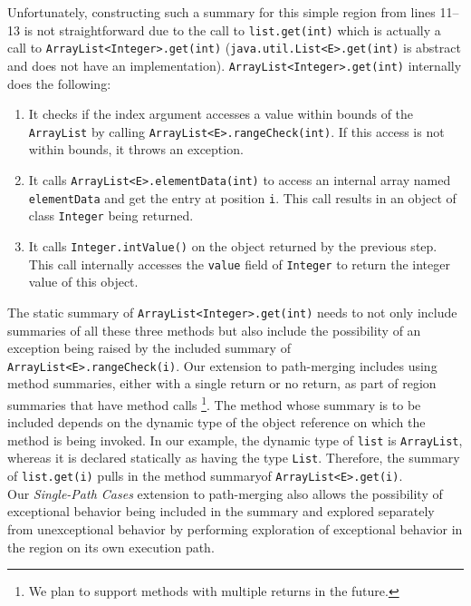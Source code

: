 %
Unfortunately, constructing such a summary for this simple region from lines 11--13 is not straightforward due to the
call to {\tt list.get(int)} which is actually a call to {\tt ArrayList<Integer>.get(int)} ({\tt java.util.List<E>.get(int)} is abstract and does not have an implementation).
%
{\tt ArrayList<Integer>.get(int)} internally does the following:
%
\begin{enumerate}
\item It checks if the index argument accesses a value within bounds of the {\tt ArrayList} by calling {\tt ArrayList<E>.rangeCheck(int)}. If this access is not within bounds, it throws an exception.
%
\item It calls {\tt ArrayList<E>.elementData(int)} to access an internal array named {\tt elementData} and get the entry at position {\tt i}. This call results in an object of class {\tt Integer} being returned.
%
\item It calls {\tt Integer.intValue()} on the object returned by the previous step. This call internally accesses the {\tt value} field of {\tt Integer} to return the integer value of this object.
%
\end{enumerate}

The static summary of {\tt ArrayList<Integer>.get(int)} needs to not only include summaries of all these three methods but
also include the possibility of an exception being raised by the included summary of {\tt ArrayList<E>.rangeCheck(i)}.
%
Our extension to path-merging includes using method summaries, either with a single return or no return, as part of region summaries that have method calls \footnote{We plan to support methods with multiple returns in the future.}.
%
The method whose summary is to be included depends on the dynamic type of the object reference on which the method is being invoked.
%
In our example, the dynamic type of {\tt list} is {\tt ArrayList}, whereas it is declared statically as having the type {\tt List}.
%
Therefore, the summary of {\tt list.get(i)} pulls in the method summaryof {\tt ArrayList<E>.get(i)}.\\
%
Our \textit{Single-Path Cases} extension to path-merging also allows the possibility of exceptional behavior being
included in the summary and explored separately from unexceptional behavior by performing exploration of exceptional
behavior in the region on its own execution path.
%
